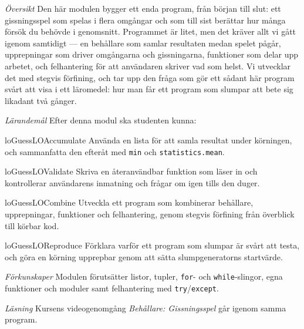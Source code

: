 \emph{Översikt}
Den här modulen bygger ett enda program, från början till slut: ett
gissningsspel som spelas i flera omgångar och som till sist berättar hur
många försök du behövde i genomsnitt.  Programmet är litet, men det
kräver allt vi gått igenom samtidigt --- en behållare som samlar
resultaten medan spelet pågår, upprepningar som driver omgångarna och
gissningarna, funktioner som delar upp arbetet, och felhantering för att
användaren skriver vad som helst.  Vi utvecklar det med stegvis
förfining, och tar upp den fråga som gör ett sådant här program svårt
att visa i ett läromedel: hur man får ett program som slumpar att bete
sig likadant två gånger.

\emph{Lärandemål}
Efter denna modul ska studenten kunna:
\begin{restatable}{lo}{GuessLOAccumulate}\label{GuessLOAccumulate}%
  Använda en lista för att samla resultat under körningen, och
  sammanfatta den efteråt med \texttt{min} och
  \texttt{statistics.mean}.
\end{restatable}%
\begin{restatable}{lo}{GuessLOValidate}\label{GuessLOValidate}%
  Skriva en återanvändbar funktion som läser in och kontrollerar
  användarens inmatning och frågar om igen tills den duger.
\end{restatable}%
\begin{restatable}{lo}{GuessLOCombine}\label{GuessLOCombine}%
  Utveckla ett program som kombinerar behållare, upprepningar,
  funktioner och felhantering, genom stegvis förfining från överblick
  till körbar kod.
\end{restatable}%
\begin{restatable}{lo}{GuessLOReproduce}\label{GuessLOReproduce}%
  Förklara varför ett program som slumpar är svårt att testa, och göra
  en körning upprepbar genom att sätta slumpgeneratorns startvärde.
\end{restatable}%

\emph{Förkunskaper}
Modulen förutsätter listor, tupler, \texttt{for}- och
\texttt{while}-slingor, egna funktioner och moduler samt
felhantering med \texttt{try}/\texttt{except}.

\emph{Läsning}
Kursens videogenomgång \emph{Behållare: Gissningsspel} går igenom samma
program.
